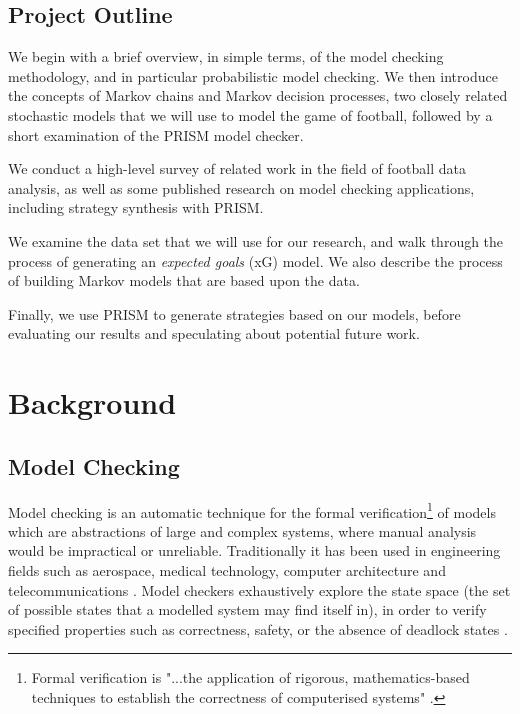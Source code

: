 \documentclass{l4proj}
\begin{document}
\section{Project Outline}

We begin with a brief overview, in simple terms, of the model checking methodology, and in particular probabilistic model checking. We then introduce the concepts of Markov chains and Markov decision processes, two closely related stochastic models that we will use to model the game of football, followed by a short examination of the PRISM model checker.

We conduct a high-level survey of related work in the field of football data analysis, as well as some published research on model checking applications, including strategy synthesis with PRISM.

We examine the data set that we will use for our research, and walk through the process of generating an \textit{expected goals} (xG) model. We also describe the process of building Markov models that are based upon the data.

Finally, we use PRISM to generate strategies based on our models, before evaluating our results and speculating about potential future work.

\chapter{Background}

\section{Model Checking}


Model checking is an automatic technique for the formal verification\footnote{Formal verification is "...the application of rigorous, mathematics-based techniques to establish the correctness of computerised systems" \cite{dpox1}.} of models which are abstractions of large and complex systems, where manual analysis would be impractical or unreliable. Traditionally it has been used in engineering fields such as aerospace, medical technology, computer architecture and telecommunications \cite{pomc1, hbmc1}. Model checkers exhaustively explore the state space (the set of possible states that a modelled system may find itself in), in order to verify specified properties such as correctness, safety, or the absence of deadlock states \cite{hbmc1}.
\end{document}
